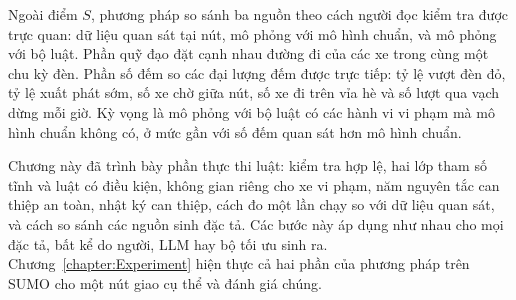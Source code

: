 \documentclass[../main.tex]{subfiles}
\begin{document}
Ngoài điểm $S$, phương pháp so sánh ba nguồn theo cách người đọc kiểm tra được trực quan: dữ liệu quan sát tại nút, mô phỏng với mô hình chuẩn, và mô phỏng với bộ luật. Phần quỹ đạo đặt cạnh nhau đường đi của các xe trong cùng một chu kỳ đèn. Phần số đếm so các đại lượng đếm được trực tiếp: tỷ lệ vượt đèn đỏ, tỷ lệ xuất phát sớm, số xe chờ giữa nút, số xe đi trên vỉa hè và số lượt qua vạch dừng mỗi giờ. Kỳ vọng là mô phỏng với bộ luật có các hành vi vi phạm mà mô hình chuẩn không có, ở mức gần với số đếm quan sát hơn mô hình chuẩn.

\medskip

Chương này đã trình bày phần thực thi luật: kiểm tra hợp lệ, hai lớp tham số tĩnh và luật có điều kiện, không gian riêng cho xe vi phạm, năm nguyên tắc can thiệp an toàn, nhật ký can thiệp, cách đo một lần chạy so với dữ liệu quan sát, và cách so sánh các nguồn sinh đặc tả. Các bước này áp dụng như nhau cho mọi đặc tả, bất kể do người, LLM hay bộ tối ưu sinh ra. Chương~\ref{chapter:Experiment} hiện thực cả hai phần của phương pháp trên SUMO cho một nút giao cụ thể và đánh giá chúng.
\end{document}
